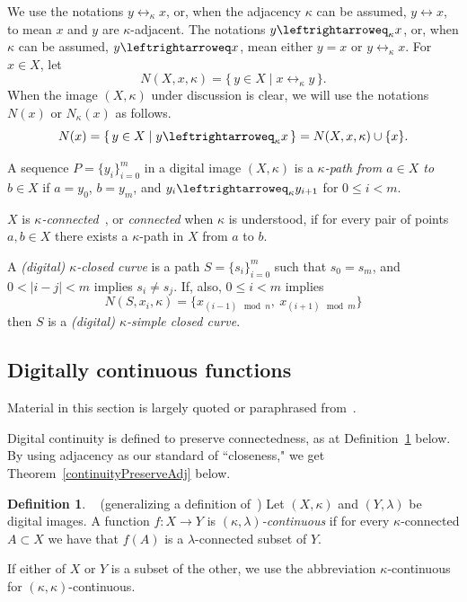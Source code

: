 \documentclass{article} \UseRawInputEncoding
\theoremstyle{plain}
\theoremstyle{definition}
\newtheorem{definition}[thm]{Definition}
\numberwithin{thm}{section}
\newcommand{\adj}{\leftrightarrow}
\newcommand{\adjeq}{\leftrightarroweq}
\begin{document}
We use the notations $y \adj_{\kappa} x$, or, when
the adjacency $\kappa$ can be assumed, $y \adj x$, to mean
$x$ and $y$ are $\kappa$-adjacent.
The notations $y \adjeq_{\kappa} x$, or, when
$\kappa$ can be assumed, $y \adjeq x$, mean either
$y=x$ or $y \adj_{\kappa} x$.
For $x \in X$, let
\[ N(X,x,\kappa) =
  \{ \, y \in X \mid x \adj_{\kappa} y \, \}.
\]
When the image $(X,\kappa)$ under discussion is clear, we
will use the notations $N(x)$ or $N_{\kappa}(x)$
as follows.
\[
N(x) = \{ \, y \in X \mid y \adjeq_{\kappa} x \, \} =
N(X,x,\kappa) \cup \{x\}.
\]

A sequence $P=\{y_i\}_{i=0}^m$ in a digital image $(X,\kappa)$ is
a {\em $\kappa$-path from $a \in X$ to $b \in X$} if
$a=y_0$, $b=y_m$, and $y_i \adjeq_{\kappa} y_{i+1}$ 
for $0 \leq i < m$.

$X$ is {\em $\kappa$-connected}~\cite{Rosenfeld},
or {\em connected} when $\kappa$
is understood, if for every pair of points $a,b \in X$ there
exists a $\kappa$-path in $X$ from $a$ to $b$.

A {\em (digital) $\kappa$-closed curve} is a
path $S=\{s_i\}_{i=0}^m$ such that $s_0=s_m$,
and $0 < |i - j| < m$ 
implies $s_i \neq s_j$. If, also, $0 \le i < m$ implies
\[ N(S,x_i,\kappa)=\{x_{(i-1)\mod n},~x_{(i+1)\mod m}\}
\]
then $S$ is a {\em (digital) 
$\kappa$-simple closed curve}.

\subsection{Digitally continuous functions}
Material in this section is largely quoted or paraphrased from~\cite{BxVariants}.

Digital continuity is defined
to preserve connectedness, as at
Definition~\ref{continuous} below. By
using adjacency as our standard of ``closeness," we
get Theorem~\ref{continuityPreserveAdj} below.

\begin{definition}
\label{continuous}
{\rm ~\cite{Boxer99} (generalizing a definition of~\cite{Rosenfeld})}
Let $(X,\kappa)$ and $(Y,\lambda)$ be digital images.
A function $f: X \rightarrow Y$ is 
{\em $(\kappa,\lambda)$-continuous} if for
every $\kappa$-connected $A \subset X$ we have that
$f(A)$ is a $\lambda$-connected subset of $Y$.
\end{definition}

If either of $X$ or $Y$ is a subset of the 
other, we use the abbreviation
$\kappa$-continuous for $(\kappa,\kappa)$-continuous.
\end{document}
